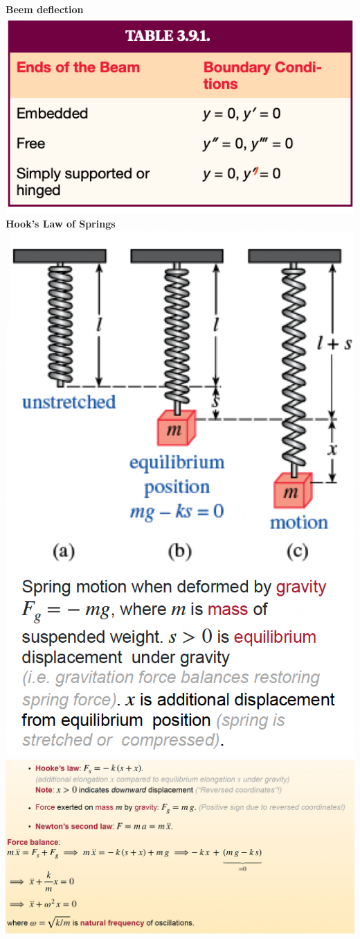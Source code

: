 \documentclass[letterpaper, 8pt]{extarticle}
\begin{document}
\begin{multicols*}{4}
	\textbf{Beem deflection} \\
	\includegraphics[width=0.6\linewidth]{beam-deflection.png} \\

	\textbf{Hook's Law of Springs} \\
	\includegraphics[width=0.6\linewidth]{hookes-law.png} \\
	\includegraphics[width=\linewidth]{force-balancing.jpeg} \\

\end{multicols*}
\end{document}
